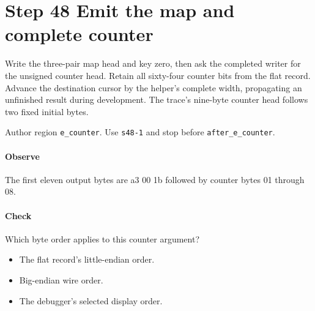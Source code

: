 \section{Step 48 Emit the map and complete counter}\label{cbor-s48}
Write the three-pair map head and key zero, then ask the completed writer for the unsigned counter head. Retain all sixty-four counter bits from the flat record. Advance the destination cursor by the helper's complete width, propagating an unfinished result during development. The trace's nine-byte counter head follows two fixed initial bytes.

Author region \texttt{e\_counter}. Use \texttt{s48-1} and stop before \texttt{after\_e\_counter}.

\paragraph{Observe} The first eleven output bytes are a3 00 1b followed by counter bytes 01 through 08.

\paragraph{Check} Which byte order applies to this counter argument?
\begin{itemize}
  \item[A.] The flat record's little-endian order.
  \item[B.] Big-endian wire order.
  \item[C.] The debugger's selected display order.
\end{itemize}
